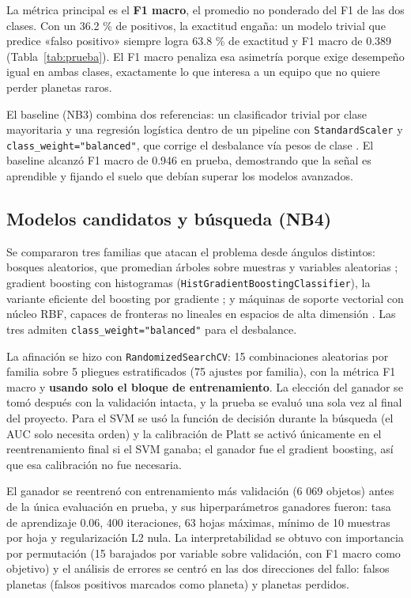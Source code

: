\documentclass[a4paper,12pt]{article}
\begin{document}
  La métrica principal es el \textbf{F1 macro}, el promedio no ponderado del F1 de
  las dos clases. Con un 36.2 \% de positivos, la exactitud engaña: un modelo
  trivial que predice «falso positivo» siempre logra 63.8 \% de exactitud y F1
  macro de 0.389 (Tabla~\ref{tab:prueba}). El F1 macro penaliza esa asimetría
  porque exige desempeño igual en ambas clases, exactamente lo que interesa a un
  equipo que no quiere perder planetas raros.

  El baseline (NB3) combina dos referencias: un clasificador trivial por clase
  mayoritaria y una regresión logística dentro de un pipeline con
  \texttt{StandardScaler} y \texttt{class\_weight="balanced"}, que corrige el
  desbalance vía pesos de clase \cite{pedregosa2011}. El baseline alcanzó F1 macro
  de 0.946 en prueba, demostrando que la señal es aprendible y fijando el suelo
  que debían superar los modelos avanzados.

  \subsection{Modelos candidatos y búsqueda (NB4)}

  Se compararon tres familias que atacan el problema desde ángulos distintos:
  bosques aleatorios, que promedian árboles sobre muestras y variables aleatorias
  \cite{breiman2001}; gradient boosting con histogramas
  (\texttt{HistGradientBoostingClassifier}), la variante eficiente del boosting
  por gradiente \cite{ke2017}; y máquinas de soporte vectorial con núcleo RBF,
  capaces de fronteras no lineales en espacios de alta dimensión
  \cite{cortes1995}. Las tres admiten \texttt{class\_weight="balanced"} para el
  desbalance.

  La afinación se hizo con \texttt{RandomizedSearchCV}: 15 combinaciones
  aleatorias por familia sobre 5 pliegues estratificados (75 ajustes por familia),
  con la métrica F1 macro y \textbf{usando solo el bloque de entrenamiento}. La
  elección del ganador se tomó después con la validación intacta, y la prueba se
  evaluó una sola vez al final del proyecto. Para el SVM se usó la función de
  decisión durante la búsqueda (el AUC solo necesita orden) y la calibración de
  Platt se activó únicamente en el reentrenamiento final si el SVM ganaba; el
  ganador fue el gradient boosting, así que esa calibración no fue necesaria.

  El ganador se reentrenó con entrenamiento más validación (6 069 objetos) antes
  de la única evaluación en prueba, y sus hiperparámetros ganadores fueron:
  tasa de aprendizaje 0.06, 400 iteraciones, 63 hojas máximas, mínimo de 10
  muestras por hoja y regularización L2 nula. La interpretabilidad se obtuvo con
  importancia por permutación (15 barajados por variable sobre validación, con F1
  macro como objetivo) y el análisis de errores se centró en las dos direcciones
  del fallo: falsos planetas (falsos positivos marcados como planeta) y planetas
  perdidos.
\end{document}
